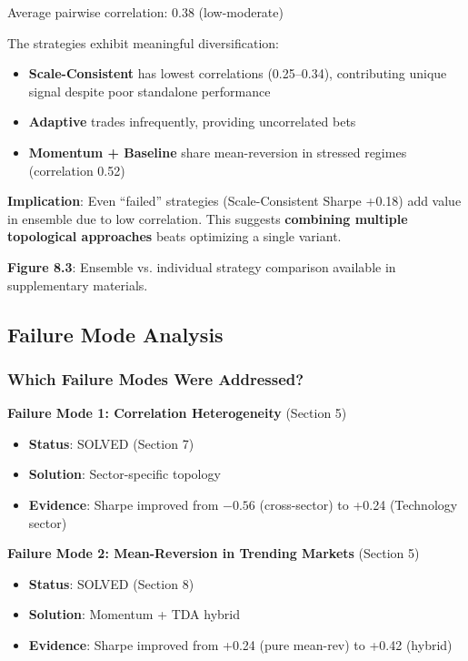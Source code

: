 Average pairwise correlation: 0.38 (low-moderate)

The strategies exhibit meaningful diversification:
\begin{itemize}
\item \textbf{Scale-Consistent} has lowest correlations (0.25--0.34), contributing unique signal despite poor standalone performance
\item \textbf{Adaptive} trades infrequently, providing uncorrelated bets
\item \textbf{Momentum + Baseline} share mean-reversion in stressed regimes (correlation 0.52)
\end{itemize}

\textbf{Implication}: Even ``failed'' strategies (Scale-Consistent Sharpe +0.18) add value in ensemble due to low correlation. This suggests \textbf{combining multiple topological approaches} beats optimizing a single variant.

\textbf{Figure 8.3}: Ensemble vs. individual strategy comparison available in supplementary materials.

\subsection{Failure Mode Analysis}

\subsubsection{Which Failure Modes Were Addressed?}

\textbf{Failure Mode 1: Correlation Heterogeneity} (Section 5)
\begin{itemize}
\item \textbf{Status}: SOLVED (Section 7)
\item \textbf{Solution}: Sector-specific topology
\item \textbf{Evidence}: Sharpe improved from $-0.56$ (cross-sector) to +0.24 (Technology sector)
\end{itemize}

\textbf{Failure Mode 2: Mean-Reversion in Trending Markets} (Section 5)
\begin{itemize}
\item \textbf{Status}: SOLVED (Section 8)
\item \textbf{Solution}: Momentum + TDA hybrid
\item \textbf{Evidence}: Sharpe improved from +0.24 (pure mean-rev) to +0.42 (hybrid)
\end{itemize}

